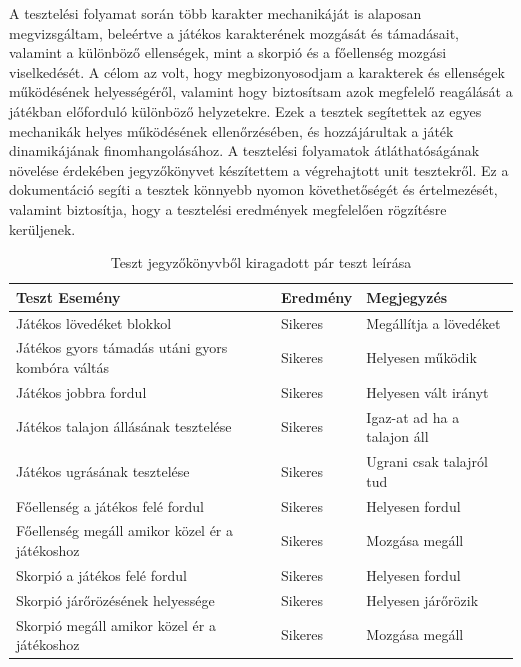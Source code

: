 \documentclass[
]{thesis-ekf}
\theoremstyle{definition}
\theoremstyle{remark}
\begin{document}
A tesztelési folyamat során több karakter mechanikáját is alaposan megvizsgáltam, beleértve a játékos karakterének mozgását és támadásait, valamint a különböző ellenségek, mint a skorpió és a főellenség mozgási viselkedését. A célom az volt, hogy megbizonyosodjam a karakterek és ellenségek működésének helyességéről, valamint hogy biztosítsam azok megfelelő reagálását a játékban előforduló különböző helyzetekre.
Ezek a tesztek segítettek az egyes mechanikák helyes működésének ellenőrzésében, és hozzájárultak a játék dinamikájának finomhangolásához.
A tesztelési folyamatok átláthatóságának növelése érdekében jegyzőkönyvet készítettem a végrehajtott unit tesztekről. Ez a dokumentáció segíti a tesztek könnyebb nyomon követhetőségét és értelmezését, valamint biztosítja, hogy a tesztelési eredmények megfelelően rögzítésre kerüljenek.
\begin{table}[h!]
\centering
\begin{tabular}{|p{9cm}|p{2cm}|p{5cm}|}
	\hline
	\textbf{Teszt Esemény} & \textbf{Eredmény} & \textbf{Megjegyzés}\\
	\hline
	Játékos lövedéket blokkol& Sikeres & Megállítja a lövedéket\\
	\hline
	Játékos gyors támadás utáni gyors kombóra váltás& Sikeres& Helyesen működik\\
	\hline
	Játékos jobbra fordul& Sikeres& Helyesen vált irányt\\
	\hline
	Játékos talajon állásának tesztelése& Sikeres&  Igaz-at ad ha a talajon áll\\
	\hline
	Játékos ugrásának tesztelése&Sikeres & Ugrani csak talajról tud\\
	\hline
	Főellenség a játékos felé fordul&Sikeres & Helyesen fordul\\
	\hline
	Főellenség megáll amikor közel ér a játékoshoz&Sikeres & Mozgása megáll \\
	\hline
	Skorpió a játékos felé fordul&Sikeres & Helyesen fordul\\
	\hline
	Skorpió járőrözésének helyessége&Sikeres & Helyesen járőrözik\\
	\hline
	Skorpió megáll amikor közel ér a játékoshoz& Sikeres& Mozgása megáll\\
	\hline
\end{tabular}
\caption{Teszt jegyzőkönyvből kiragadott pár teszt leírása}
\end{table}
\end{document}
